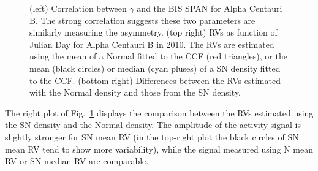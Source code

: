 \documentclass{aa}
\begin{document}
\begin{figure}[htbp]
\begin{center}
   \caption{(left) Correlation between $\gamma$ and the BIS SPAN for Alpha Centauri B. The strong correlation suggests these two parameters are similarly measuring the asymmetry. (top right) RVs as function of Julian Day for Alpha Centauri B in 2010. The RVs are estimated using the mean of a Normal fitted to the CCF (red triangles), or the mean (black circles) or median (cyan pluses) of a SN density fitted to the CCF. (bottom right) Differences between the RVs estimated with the Normal density and those from the SN density.}
   \label{fig:alphacent:corr.gamma}
\end{center}
\end{figure}
%

The right plot of Fig.~\ref{fig:alphacent:corr.gamma} displays the comparison between the RVs estimated using the SN density and the Normal density. 
The amplitude of the activity signal is slightly stronger for SN mean RV (in the top-right plot the black circles of SN mean RV tend to show more variability), while the signal measured using N mean RV or SN median RV are comparable. 
%
%
\end{document}
